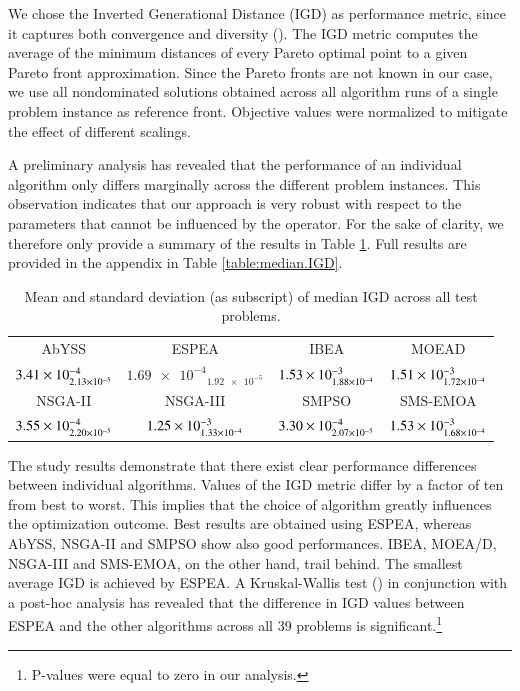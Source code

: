 We chose the Inverted Generational Distance (IGD) as performance metric, since it captures both convergence and diversity (\cite{van1998evolutionary}). The IGD metric computes the average of the minimum distances of every Pareto optimal point to a given Pareto front approximation. Since the Pareto fronts are not known in our case, we use all nondominated solutions obtained across all algorithm runs of a single problem instance as reference front. Objective values were normalized to mitigate the effect of different scalings.

A preliminary analysis has revealed that the performance of an individual algorithm only differs marginally across the different problem instances. This observation indicates that our approach is very robust with respect to the parameters that cannot be influenced by the operator. For the sake of clarity, we therefore only provide a summary of the results in Table \ref{tbl:summary}. Full results are provided in the appendix in Table \ref{table:median.IGD}.

\begin{table}
\caption{Mean and standard deviation (as subscript) of median IGD across all test problems.}
\label{tbl:summary}
\centering
\begin{tabular}{*{4}{c}} \toprule
AbYSS & ESPEA & IBEA & MOEAD\\ \cmidrule(lr){1-1} \cmidrule(lr){2-2} \cmidrule(lr){3-3} \cmidrule(lr){4-4}
$\num{3.41E-4}_{\num{2.13E-5}}$ & $\num{1.69e-4}_{\num{1.92e-5}}$ & $\num{1.53E-3}_{\num{1.88E-4}}$ & $\num{1.51E-3}_{\num{1.72E-4}}$ \\ \midrule
NSGA-II & NSGA-III & SMPSO & SMS-EMOA \\ \cmidrule(lr){1-1} \cmidrule(lr){2-2} \cmidrule(lr){3-3} \cmidrule(lr){4-4}
$\num{3.55E-4}_{\num{2.20E-5}}$ & $\num{1.25E-3}_{\num{1.33E-4}}$ & $\num{3.30E-4}_{\num{2.07E-5}}$ & $\num{1.53E-3}_{\num{1.68E-4}}$ \\
\bottomrule
\end{tabular}
\end{table}

The study results demonstrate that there exist clear performance differences between individual algorithms. Values of the IGD metric differ by a factor of ten from best to worst. This implies that the choice of algorithm greatly influences the optimization outcome. Best results are obtained using ESPEA, whereas AbYSS, NSGA-II and SMPSO show also good performances. IBEA, MOEA/D, NSGA-III and SMS-EMOA, on the other hand, trail behind. The smallest average IGD is achieved by ESPEA. A Kruskal-Wallis test (\cite{kruskal1952use}) in conjunction with a post-hoc analysis has revealed that the difference in IGD values between ESPEA and the other algorithms across all 39 problems is significant.\footnote{P-values were equal to zero in our analysis.}

